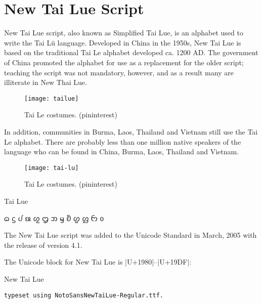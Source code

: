 \section{New Tai Lue Script}
\label{s:newtailue}
\newfontfamily{}


New Tai Lue script, also known as Simplified Tai Lue, is an alphabet used to write the Tai Lü language. Developed in China in the 1950s, New Tai Lue is based on the traditional Tai Le alphabet developed ca. 1200 AD. The government of China promoted the alphabet for use as a replacement for the older script; teaching the script was not mandatory, however, and as a result many are illiterate in New Thai Lue. 

\begin{figure}[htbp]
\centering

\texttt{[image: tailue]}

\caption{Tai Le costumes. (pininterest)}
\end{figure}

In addition, communities in Burma, Laos, Thailand and Vietnam still use the Tai Le alphabet. There are probably less than one million native speakers of the language who can be found in China, Burma, Laos, Thailand and Vietnam.

\begin{figure}[htbp]
\centering

\texttt{[image: tai-lu]}

\caption{Tai Le costumes. (pininterest)}
\end{figure}

\begin{scriptexample}[]{Tai Lue}
{\centering\tailue \LARGE

ᦒ	ᦓ	ᦔ	ᦕ	ᦖ	ᦗ	ᦘ	ᦙ	ᦚ	ᦛ	ᦜ	ᦝ	ᦞ	

}
\end{scriptexample}

The New Tai Lue script was added to the Unicode Standard in March, 2005 with the release of version 4.1.

The Unicode block for New Tai Lue is |U+1980|–|U+19DF|:

\begin{scriptexample}[]{New Tai Lue}

\texttt{typeset using NotoSansNewTaiLue-Regular.ttf.}
\end{scriptexample}